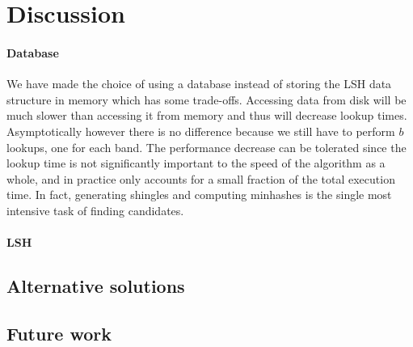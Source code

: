 \section{Discussion}




\paragraph{Database}
We have made the choice of using a database instead of storing the LSH data structure in memory which has some trade-offs. Accessing data from disk will be much slower than accessing it from memory and thus will decrease lookup times. Asymptotically however there is no difference because we still have to perform $b$ lookups, one for each band. The performance decrease can be tolerated since the lookup time is not significantly important to the speed of the algorithm as a whole, and in practice only accounts for a small fraction of the total execution time. In fact, generating shingles and computing minhashes is the single most intensive task of finding candidates.

\paragraph{LSH}

\subsection{Alternative solutions}

\subsection{Future work}
